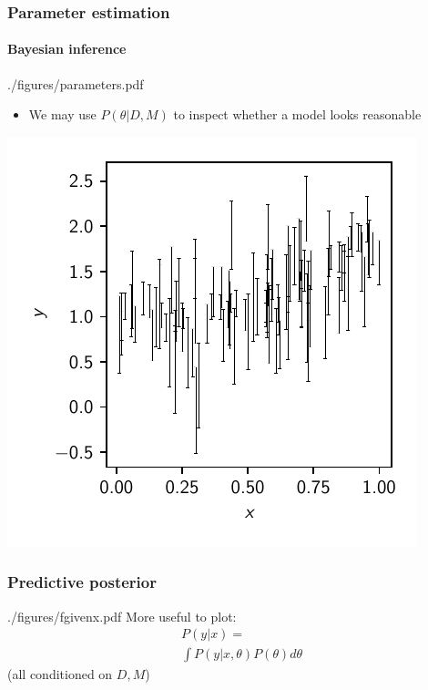 \documentclass[%
]{beamer}
\begin{document}
\begin{frame}
    \frametitle{Parameter estimation}
    \framesubtitle{Bayesian inference}
    \begin{figright}[0.3]{./figures/parameters.pdf}
        \begin{itemize}
            \item We may use $P(\theta|D,M)$ to inspect whether a model looks reasonable
        \end{itemize}
        \includegraphics[width=\textwidth]{./figures/data.pdf}
    \end{figright}
\end{frame}

\begin{frame}
    \frametitle{Predictive posterior}
    \begin{figright}[0.4]{./figures/fgivenx.pdf}
        More useful to plot:
        \begin{align}
        &P(y|x) = \nonumber\\
        &\int P(y|x,\theta) P(\theta) d\theta \nonumber
        \end{align}
        (all conditioned on $D,M$)
    \end{figright}
\end{frame}
\end{document}

